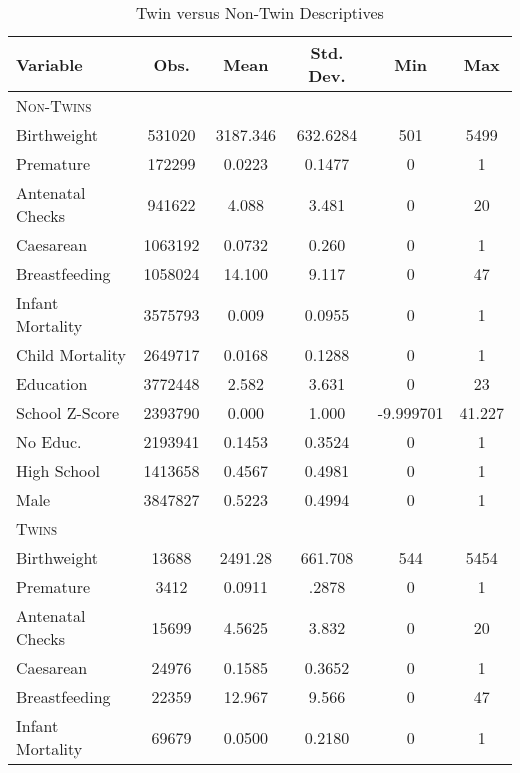 \begin{table}[htpb!]							
\caption{Twin versus Non-Twin Descriptives}		
\label{tab:twinDesc}	
\begin{center}
\begin{tabular}{lccccc} \toprule
\textbf{Variable} &   \textbf{Obs.} & \textbf{Mean} & \textbf{Std. Dev.} &  \textbf{Min} &  \textbf{Max} \\ \midrule
\multicolumn{6}{l}{\textsc{Non-Twins}} \\
Birthweight &    531020 &   3187.346 &   632.6284  &      501  &     5499\\
Premature &    172299  &  0.0223 &    0.1477 &          0   &       1\\
Antenatal Checks &    941622  &  4.088 &    3.481 &          0  &       20\\
Caesarean &   1063192  &  0.0732 &     0.260 &          0        &  1\\
Breastfeeding &   1058024  &  14.100 &    9.117 &          0     &    47\\
Infant Mortality &   3575793 &   0.009 &    0.0955 &          0  &        1\\
Child Mortality &   2649717  &  0.0168 &    0.1288 &          0   &       1\\
Education &   3772448 &   2.582 &    3.631 &          0       &  23\\
School Z-Score &   2393790  &  0.000 &    1.000 &  -9.999701 &  41.227 \\
No Educ. &   2193941  &  0.1453 &    0.3524 &          0      &    1\\
High School &   1413658  &  0.4567 &    0.4981 &          0     &     1\\
Male &   3847827  &  0.5223 &   0.4994 &          0        &  1\\ \midrule
\multicolumn{6}{l}{\textsc{Twins}} \\
Birthweight &     13688  &   2491.28  &  661.708 &       544  &     5454\\
Premature &      3412  &  0.0911 &    .2878 &          0     &     1\\
Antenatal Checks &     15699  &  4.5625 &    3.832 &          0 &        20\\
Caesarean &     24976  &  0.1585 &    0.3652 &          0        &  1\\
Breastfeeding &     22359  &  12.967 &    9.566 &          0     &    47\\
Infant Mortality &     69679  &  0.0500 &    0.2180 &          0   &       1\\

\end{tabular}
\end{center}
\end{table}
